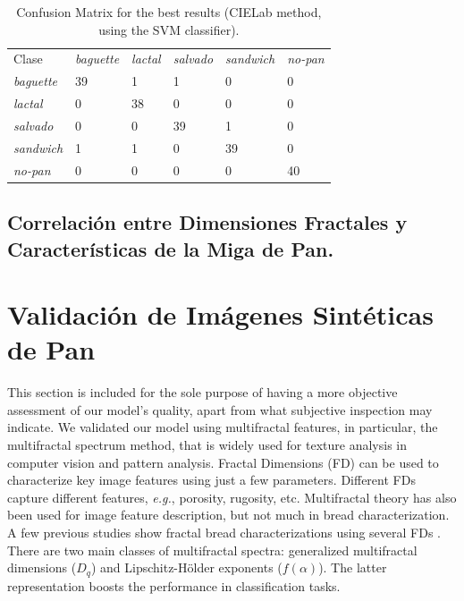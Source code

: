 \documentclass[spanish,a4paper,11pt,oneside,links]{report}
\begin{document}
\begin{table}[h!]
\caption{Confusion Matrix for the best results (CIELab method, using the SVM classifier).}
\label{tab:confusionmatrix}       %
\begin{tabular}{llllll}
\hline\noalign{\smallskip}
Clase&{\em baguette} & {\em lactal} & {\em salvado} &{\em sandwich}&{\em no-pan} \\
\noalign{\smallskip}\hline\noalign{\smallskip}
{\em baguette} & 39& 1 &1 &0 &0 \\
{\em lactal} & 0& 38 &0 &0 &0  \\
{\em salvado} & 0& 0 &39 &1 &0  \\
{\em sandwich} & 1& 1 &0 &39 &0  \\
{\em no-pan} & 0& 0 &0 &0 &40  \\
\hline
\end{tabular}
\end{table}


\subsection{Correlación entre Dimensiones Fractales y Características de la Miga de Pan.}

\section{Validación de Imágenes Sintéticas de Pan}

This section is included for the sole purpose of having a more objective assessment of our model's quality, apart from what subjective inspection may indicate. 
We validated our model using multifractal features, in particular, the multifractal spectrum method, that is widely used for texture analysis in computer vision and pattern analysis.
Fractal Dimensions (FD) can be used to characterize key image features using just a few parameters. 
Different FDs capture different features, {\em e.g.}, porosity, rugosity, etc.
Multifractal theory has also been used for image feature description, but not much in bread characterization. 
A few previous studies show fractal bread characterizations using several FDs \cite{Gonzales2008,Baravalle2012}. 
There are two main classes of multifractal spectra: generalized multifractal dimensions ($D_{q}$) and Lipschitz-H\"older exponents ($f(\alpha)$). 
The latter representation boosts the performance in classification tasks.
\end{document}
